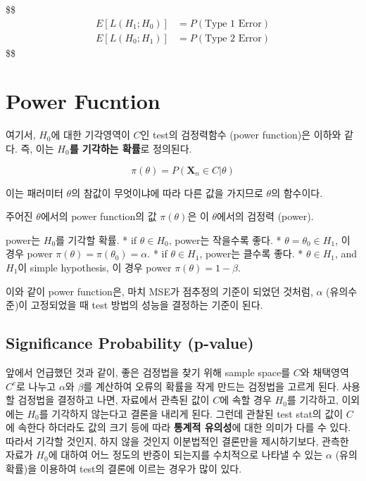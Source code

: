 \documentclass[
]{book}
\begin{document}
\$\$
\begin{align*}

E \left [ L(H_1 ; H_0 ) \right] &= P(\text{Type 1 Error}) \\
E \left [ L(H_0 ; H_1 ) \right] &= P(\text{Type 2 Error})

\end{align*}
\$\$

\hypertarget{power-fucntion}{%
\section{Power Fucntion}\label{power-fucntion}}

여기서, \(H_0\)에 대한 기각영역이 \(C\)인 test의 검정력함수 (power function)은 이하와 같다. 즉, 이는 \textbf{\(H_0\)를 기각하는 확률}로 정의된다.

\[
\pi(\theta) = P (\pmb X_n \in C \vert \theta)
\]

이는 패러미터 \(\theta\)의 참값이 무엇이냐에 따라 다른 값을 가지므로 \(\theta\)의 함수이다.

주어진 \(\theta\)에서의 power function의 값 \(\pi(\theta)\)은 이 \(\theta\)에서의 검정력 (power).

power는 \(H_0\)를 기각할 확률.
* if \(\theta \in H_0\), power는 작을수록 좋다.
* \(\theta = \theta_0 \in H_1\), 이 경우 power \(\pi(\theta) = \pi(\theta_0) = \alpha\).
* if \(\theta \in H_1\), power는 클수록 좋다.
* \(\theta \in H_1\), and \(H_1\)이 simple hypothesis, 이 경우 power \(\pi(\theta) = 1- \beta\).

이와 같이 power function은, 마치 MSE가 점추정의 기준이 되었던 것처럼, \(\alpha\) (유의수준)이 고정되었을 때 test 방법의 성능을 결정하는 기준이 된다.

\hypertarget{significance-probability-p-value}{%
\subsection{Significance Probability (p-value)}\label{significance-probability-p-value}}

앞에서 언급했던 것과 같이, 좋은 검정법을 찾기 위해 sample space를 \(C\)와 채택영역 \(C^c\)로 나누고 \(\alpha\)와 \(\beta\)를 계산하여 오류의 확률을 작게 만드는 검정법을 고르게 된다. 사용할 검정법을 결정하고 나면, 자료에서 관측된 값이 \(C\)에 속할 경우 \(H_0\)를 기각하고, 이외에는 \(H_0\)를 기각하지 않는다고 결론을 내리게 된다. 그런데 관찰된 test stat의 값이 \(C\)에 속한다 하더라도 값의 크기 등에 따라 \textbf{통계적 유의성}에 대한 의미가 다를 수 있다. 따라서 기각할 것인지, 하지 않을 것인지 이분법적인 결론만을 제시하기보다, 관측한 자료가 \(H_0\)에 대하여 어느 정도의 반증이 되는지를 수치적으로 나타낼 수 있는 \(\alpha\) (유의확률)을 이용하여 test의 결론에 이르는 경우가 많이 있다.
\end{document}
